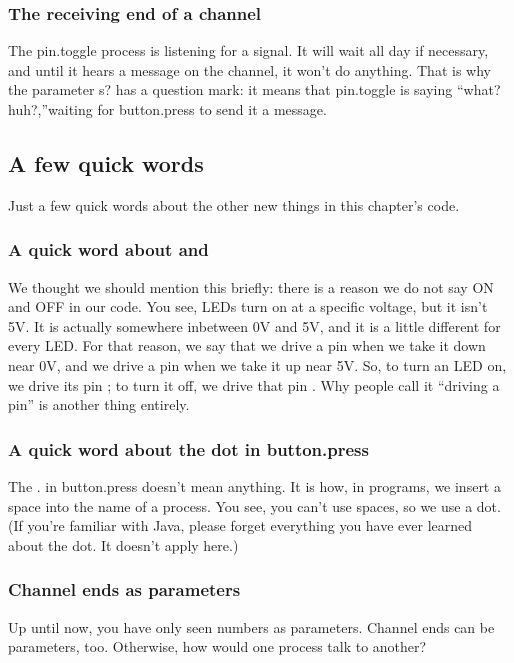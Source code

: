 \subsubsection{The receiving end of a channel}
The {\procname pin.toggle} process is listening for a signal. It will wait all day if necessary, and until it hears a message on the channel, it won't do anything. That is why the parameter {\code s?} has a question mark: it means that {\procname pin.toggle} is saying ``what? huh?,''waiting for {\procname button.press} to send it a message.

\subsection{A few quick words}
Just a few quick words about the other new things in this chapter's code.

\subsubsection{A quick word about \LOW and \HIGH}
We thought we should mention this briefly: there is a reason we do not say {\code ON} and {\code OFF} in our code. You see, LEDs turn on at a specific voltage, but it isn't 5V. It is actually somewhere inbetween 0V and 5V, and it is a little different for every LED. For that reason, we say that we drive a pin \LOW when we take it down near 0V, and we drive a pin \HIGH when we take it up near 5V. So, to turn an LED on, we drive its pin \HIGH; to turn it off, we drive that pin \LOW. Why people call it ``driving a pin'' is another thing entirely.

\subsubsection{A quick word about the dot in {\procname button.press}}
The {\code .} in {\procname button.press} doesn't mean anything. It is how, in \plumbing programs, we insert a space into the name of a process. You see, you can't use spaces, so we use a dot. (If you're familiar with Java, please forget everything you have ever learned about the dot. It doesn't apply here.)

\subsubsection{Channel ends as parameters}
Up until now, you have only seen numbers as parameters. Channel ends can be parameters, too. Otherwise, how would one process talk to another?

